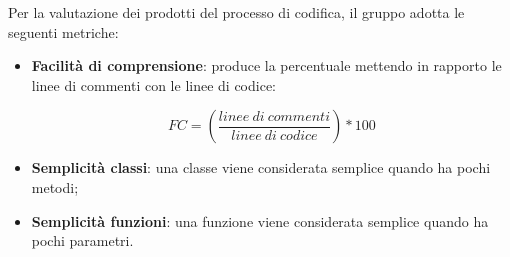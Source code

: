 Per la valutazione dei prodotti del processo di codifica, il gruppo adotta le seguenti metriche:
\begin{itemize}
	\item \textbf{Facilità di comprensione}: produce la percentuale mettendo in rapporto le linee di commenti con le linee di codice:
\begin{center}
\[FC = \left(\frac{linee\ di\ commenti}{linee\ di\ codice}\right)*100\]
\end{center}
	\item \textbf{Semplicità classi}: una classe viene considerata semplice quando ha pochi metodi;
	\item \textbf{Semplicità funzioni}: una funzione viene considerata semplice quando ha pochi parametri.
\end{itemize}


